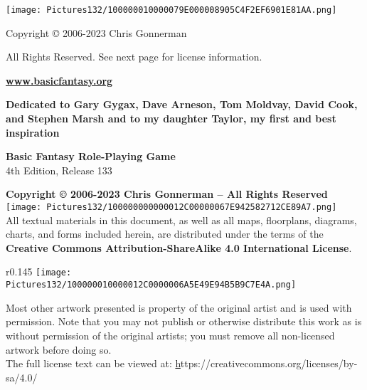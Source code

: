 \documentclass[a4paper,twoside,openany,10pt]{book}
\begin{document}
	
\justifying
\thispagestyle{empty}

\begin{center}
\texttt{[image: Pictures132/100000010000079E000008905C4F2EF6901E81AA.png]}
\end{center}

\begin{center}

{{\huge Copyright © 2006-2023 Chris Gonnerman}}\bigskip

{\LARGE All Rights Reserved. See next page for license information}.\bigskip

{\LARGE \href{https://www.basicfantasy.org}{\textbf{www.basicfantasy.org}}}\bigskip
 
\end{center}

\pagebreak

\thispagestyle{empty}

\begin{center}
\textbf{Dedicated to Gary Gygax, Dave Arneson, Tom Moldvay, David Cook, and Stephen Marsh and to my daughter Taylor, my first and best inspiration}
\end{center}

\addvspace{1.5cm}

{\large \textbf{Basic Fantasy Role-Playing Game}}\\

{\large 4th Edition, Release 133}

\textbf{Copyright © 2006-2023 Chris Gonnerman -- All Rights Reserved}
\hfill
\texttt{[image: Pictures132/100000000000012C00000067E942582712CE89A7.png]}\\

All textual materials in this document, as well as all maps, floorplans, diagrams, charts, and forms included herein, are distributed under the terms of the \textbf{Creative Commons Attribution-ShareAlike 4.0 International License}.
\begin{wrapfigure}{r}{0.145\textwidth}
	\texttt{[image: Pictures132/100000010000012C0000006A5E49E94B5B9C7E4A.png]}
\end{wrapfigure}

Most other artwork presented is property of the original artist and is used with permission. Note that you may not publish or otherwise distribute this work as is without permission of the original artists; you must remove all non-licensed artwork before doing so.\\

The full license text can be viewed at:  \href{https://creativecommons.org/licenses/by-sa/4.0/} https://creativecommons.org/licenses/by-sa/4.0/\\
\end{document}
